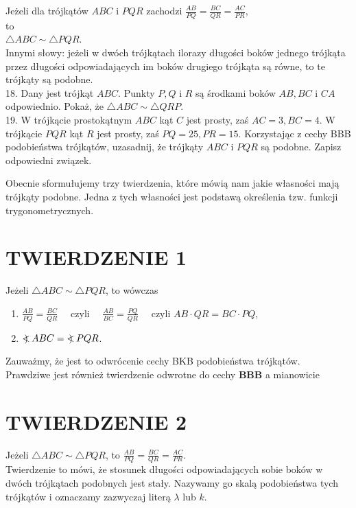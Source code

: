 \documentclass[10pt]{article}
\newcommand\Varangle{\mathop{{<\!\!\!\!\!\text{\small)}}\:}\nolimits}
\begin{document}
Jeżeli dla trójkątów \(A B C\) i \(P Q R\) zachodzi \(\frac{A B}{P Q}=\frac{B C}{Q R}=\frac{A C}{P R}\),\\
to\\
\(\triangle A B C \sim \triangle P Q R\).\\
Innymi słowy: jeżeli w dwóch trójkątach ilorazy długości boków jednego trójkąta przez długości odpowiadających im boków drugiego trójkąta są równe, to te trójkąty są podobne.\\
18. Dany jest trójkąt \(A B C\). Punkty \(P, Q\) i \(R\) są środkami boków \(A B, B C\) i \(C A\) odpowiednio. Pokaż, że \(\triangle A B C \sim \triangle Q R P\).\\
19. W trójkącie prostokątnym \(A B C\) kąt \(C\) jest prosty, zaś \(A C=3, B C=4\). W trójkącie \(P Q R\) kąt \(R\) jest prosty, zaś \(P Q=25, P R=15\). Korzystając z cechy BBB podobieństwa trójkątów, uzasadnij, że trójkąty \(A B C\) i \(P Q R\) są podobne. Zapisz odpowiedni związek.

Obecnie sformułujemy trzy twierdzenia, które mówią nam jakie własności mają trójkąty podobne. Jedna z tych własności jest podstawą określenia tzw. funkcji trygonometrycznych.

\section*{TWIERDZENIE 1}
Jeżeli \(\triangle A B C \sim \triangle P Q R\), to wówczas

\begin{enumerate}
  \item \(\frac{A B}{P Q}=\frac{B C}{Q R} \quad\) czyli \(\quad \frac{A B}{B C}=\frac{P Q}{Q R} \quad\) czyli \(A B \cdot Q R=B C \cdot P Q\),
  \item \(\Varangle A B C=\Varangle P Q R\).
\end{enumerate}

Zauważmy, że jest to odwrócenie cechy BKB podobieństwa trójkątów.\\
Prawdziwe jest również twierdzenie odwrotne do cechy \(\mathbf{B B B}\) a mianowicie

\section*{TWIERDZENIE 2}
Jeżeli \(\triangle A B C \sim \triangle P Q R\), to \(\frac{A B}{P Q}=\frac{B C}{Q R}=\frac{A C}{P R}\).\\
Twierdzenie to mówi, że stosunek długości odpowiadających sobie boków w dwóch trójkątach podobnych jest stały. Nazywamy go skalą podobieństwa tych trójkątów i oznaczamy zazwyczaj literą \(\lambda\) lub \(k\).
\end{document}
